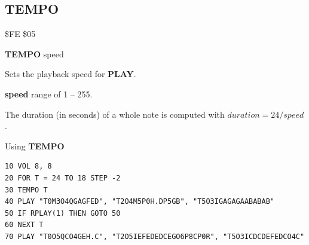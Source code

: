 \subsection{TEMPO}
\begin{description}[leftmargin=2cm,style=nextline]
\item [Token:]    \$FE \$05

\item [Format:]   {\bf TEMPO} speed

\item [Usage:]    Sets the playback speed for {\bf PLAY}.

                  {\bf speed} range of 1 -- 255.

                  The duration (in seconds) of a whole note is computed with $duration = 24 / speed$.

\item [Example:]  Using {\bf TEMPO}

\begin{tcolorbox}[colback=black,coltext=white]
\verbatimfont{\codefont}
\begin{verbatim}
10 VOL 8, 8
20 FOR T = 24 TO 18 STEP -2
30 TEMPO T
40 PLAY "T0M3O4QGAGFED", "T2O4M5P0H.DP5GB", "T5O3IGAGAGAABABAB"
50 IF RPLAY(1) THEN GOTO 50
60 NEXT T
70 PLAY "T0O5QCO4GEH.C", "T2O5IEFEDEDCEGO6P8CP0R", "T5O3ICDCDEFEDCO4C"
\end{verbatim}
\end{tcolorbox}
\end{description}


\newpage
